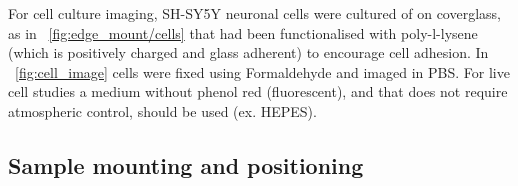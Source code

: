 For cell culture imaging, \gls{SH-SY5Y} neuronal cells were cultured of on coverglass, as in \figurename~\ref{fig:edge_mount/cells} that had been functionalised with poly-l-lysene (which is positively charged and glass adherent) to encourage cell adhesion.
In \figurename~\ref{fig:cell_image} cells were fixed using Formaldehyde and imaged in \gls{PBS}.
For live cell studies a medium without phenol red (fluorescent), and that does not require atmospheric control, should be used (ex. HEPES).

\subsection{Sample mounting and positioning}

